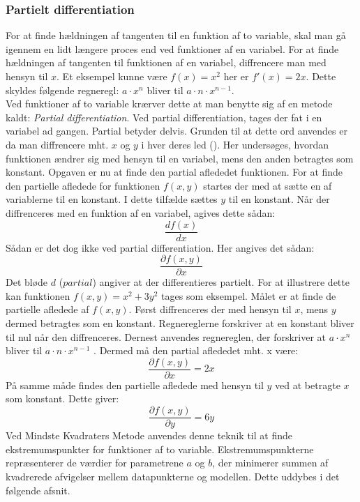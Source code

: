 \subsubsection{Partielt differentiation}\label{sec:PartieltDifferentiation}
For at finde hældningen af tangenten til en funktion af to variable, skal man gå igennem en lidt længere proces end ved funktioner af en variabel. For at finde hældningen af tangenten til funktionen af en variabel, diffrencere man med hensyn til $x$. Et eksempel kunne være $f(x) = x^2$ her er $f'(x) = 2x$. Dette skyldes følgende regneregl: $a \cdot x^n$ bliver til $a \cdot n \cdot x^{n-1}$. \\ Ved funktioner af to variable krærver dette at man benytte sig af en metode kaldt: \textit{Partial differentiation}. Ved partial differentiation, tages der fat i en variabel ad gangen. Partial betyder delvis. Grunden til at dette ord anvendes er da man diffrencere mht. $x$ og $y$ i hver deres led (\cite[4]{Larsen2016}). Her undersøges, hvordan funktionen ændrer sig med hensyn til en variabel, mens den anden betragtes som konstant. Opgaven er nu at finde den partial aflededet funktionen. For at finde den partielle afledede for funktionen $f(x,y)$ startes der med at sætte en af variablerne til en konstant. I dette tilfælde sættes $y$ til en konstant. Når der diffrenceres med en funktion af en variabel, agives dette sådan: \begin{equation}\frac{d f(x)}{d x}\end{equation} Sådan er det dog ikke ved partial differentiation. Her angives det sådan: \begin{equation}\frac{\partial f(x,y)}{\partial x}\end{equation} 
Det bløde $d$ ($partial$) angiver at der differentieres partielt. For at illustrere dette kan funktionen $f(x,y) = x^2 + 3y^2$ tages som eksempel. Målet er at finde de partielle afledede af $f(x,y)$. Først diffrenceres der med hensyn til $x$, mens $y$ dermed betragtes som en konstant. Regnereglerne forskriver at en konstant bliver til nul når den diffrenceres. Dernest anvendes regnereglen, der forskriver at \begin{math}a \cdot x^n\end{math} bliver til \begin{math}a \cdot n \cdot x^{n-1}\end{math} \cite[14]{Pihl2019}. Dermed må den partial aflededet mht. x være: 
\begin{equation}\frac{\partial f(x,y)}{\partial x} = 2x\end{equation}
På samme måde findes den partielle afledede med hensyn til $y$ ved at betragte $x$ som konstant. Dette giver:
\begin{equation}\frac{\partial f(x,y)}{\partial y} = 6y\end{equation}
Ved Mindste Kvadraters Metode anvendes denne teknik til at finde ekstremumspunkter for funktioner af to variable. Ekstremumspunkterne repræsenterer de værdier for parametrene $a$ og $b$, der minimerer summen af kvadrerede afvigelser mellem datapunkterne og modellen. Dette uddybes i det følgende afsnit.
\newpage
